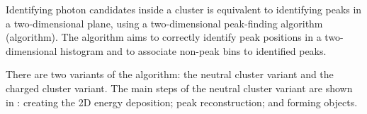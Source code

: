 





Identifying photon candidates inside a cluster is equivalent to identifying peaks in a two-dimensional plane, using a two-dimensional peak-finding algorithm (\peakFinding algorithm). The \peakFinding algorithm aims to correctly identify peak positions in a two-dimensional histogram and to associate non-peak bins to identified peaks.


There are two variants of the \peakFinding algorithm: the neutral cluster variant and the charged cluster variant. The main steps of the neutral cluster variant are shown in : creating the 2D  energy deposition; peak reconstruction; and forming \ShowerPeak objects.



